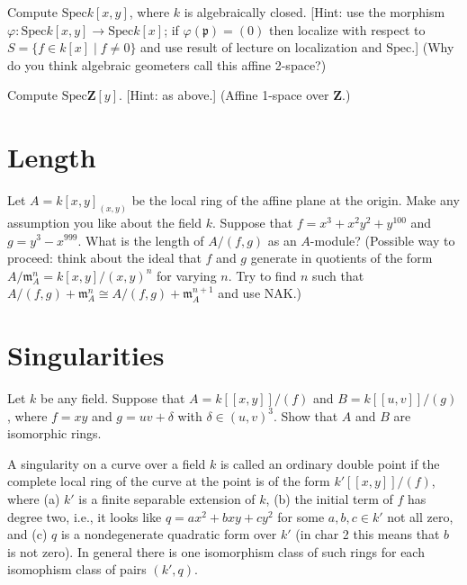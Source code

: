 \begin{exercise}
 Compute $\text{Spec} k[x,y]$, where $k$ is algebraically
closed.
[Hint: use the morphism $\varphi: \text{Spec} k[x,y]\to\text{Spec} k[x]$;
if $\varphi({\mathfrak p})=(0)$ then localize with respect to $S=\{f\in k[x]
\mid f\not=0\}$ and use result of lecture on localization and $\text{Spec}$.]
(Why do you think algebraic geometers call this affine 2-space?)
\end{exercise}

\begin{exercise}
Compute $\text{Spec} \mathbf{Z}[y]$. 
[Hint: as above.] (Affine 1-space over $\mathbf{Z}$.)
\end{exercise}






\section{Length}
\label{section-length}

\begin{exercise}
Let $A=k[x,y]_{(x,y)}$ be the local ring of the affine plane at
the origin. Make any assumption you like about the field $k$. Suppose
that $f = x^3 + x^2y^2 + y^{100}$ and $g = y^3 - x^{999}$. What is the length
of $A/(f,g)$ as an $A$-module? (Possible way to proceed: think about the
ideal that $f$ and $g$ generate in quotients of the form $A/{\mathfrak m}_A^n=
k[x,y]/(x,y)^n$ for varying $n$. Try to find $n$ such that 
$A/(f,g)+{\mathfrak m}_A^n \cong A/(f,g)+{\mathfrak m}_A^{n+1}$ and use NAK.)
\end{exercise}



\section{Singularities}
\label{section-singularities}

\begin{exercise}
Let $k$ be any field. Suppose that $A=k[[x,y]]/(f)$ and
$B=k[[u,v]]/(g)$, where $f=xy$ and $g=uv+\delta$ with $\delta \in (u,v)^3$.
Show that $A$ and $B$ are isomorphic rings.
\end{exercise}

\begin{remark}
A singularity on a curve over a field $k$ is called an
ordinary double point if the complete local ring of the curve at the
point is of the form $k'[[x,y]]/(f)$, where (a) $k'$ is a finite separable
extension of $k$, (b) the initial term of $f$ has degree two, i.e., it
looks like $q=ax^2+bxy+cy^2$ for some $a,b,c\in k'$ not all zero, and (c) 
$q$ is a nondegenerate quadratic form over $k'$ (in char 2 this means that
$b$ is not zero). In general there is one isomorphism class of such rings for
each isomophism class of pairs $(k',q)$.
\end{remark}






